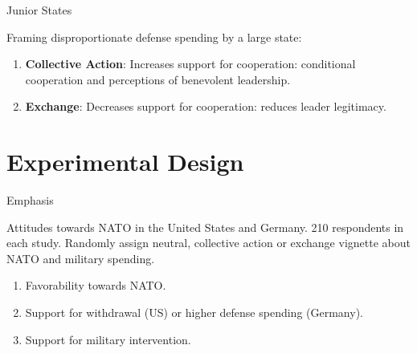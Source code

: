 \documentclass[12pt]{beamer}
\begin{document}

\begin{frame}{Junior States}

Framing disproportionate defense spending by a large state: 
\pause 
\begin{enumerate} 
\item \textbf{Collective Action}: Increases support for cooperation: conditional cooperation and perceptions of benevolent leadership. 
\pause 
\item \textbf{Exchange}: Decreases support for cooperation: reduces leader legitimacy. 
\end{enumerate}


\end{frame} 




\section{Experimental Design} 


\begin{frame}{Emphasis}

Attitudes towards NATO in the United States and Germany. 210 respondents in each study. Randomly assign neutral, collective action or exchange vignette about NATO and military spending. 

\pause 
\begin{enumerate} 
\item Favorability towards NATO. 
\pause 
\item Support for withdrawal (US) or higher defense spending (Germany).  
\pause
\item Support for military intervention. 
\end{enumerate}


\end{frame} 

\end{document}
